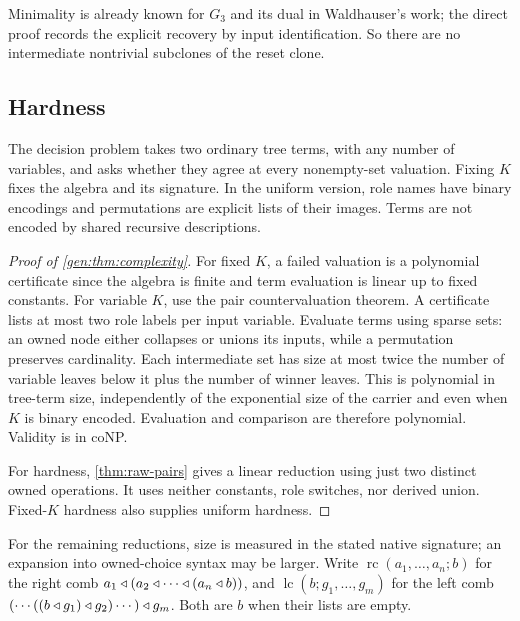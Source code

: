 Minimality is already known for $G_3$ and its dual in Waldhauser's work; the direct proof records the explicit recovery by input identification. So there are no intermediate nontrivial subclones of the reset clone.

\subsection{Hardness}\label{app:proofs-hard}

The decision problem takes two ordinary tree terms, with any number of variables, and asks whether they agree at every nonempty-set valuation. Fixing $K$ fixes the algebra and its signature. In the uniform version, role names have binary encodings and permutations are explicit lists of their images. Terms are not
encoded by shared recursive descriptions.

\begin{proof}[Proof of \cref{gen:thm:complexity}]
For fixed $K$, a failed valuation is a polynomial certificate since the
algebra is finite and term evaluation is linear up to fixed constants.
For variable $K$, use the pair countervaluation theorem. A certificate
lists at most two role labels per input variable. Evaluate terms using
sparse sets: an owned node either collapses or unions its inputs, while
a permutation preserves cardinality. Each intermediate set has size at
most twice the number of variable leaves below it plus the number of
winner leaves. This is polynomial in tree-term size, independently of
the exponential size of the carrier and even when $K$ is binary encoded.
Evaluation and comparison are therefore polynomial. Validity is in coNP.

For hardness, \cref{thm:raw-pairs} gives a linear reduction
using just two distinct owned operations. It uses neither constants,
role switches, nor derived union. Fixed-$K$ hardness also supplies
uniform hardness.
\end{proof}

For the remaining reductions, size is measured in the stated native signature; an expansion into owned-choice syntax may be larger. Write $\operatorname{rc}(a_1,\ldots,a_n;b)$ for the right comb
$a_1\mathbin{\triangleleft}(a_2\mathbin{\triangleleft}\cdots\mathbin{\triangleleft}(a_n\mathbin{\triangleleft} b))$, and $\operatorname{lc}(b;g_1,\ldots,g_m)$ for the left comb $(\cdots((b\mathbin{\triangleleft} g_1)\mathbin{\triangleleft} g_2)\cdots)\mathbin{\triangleleft} g_m$. Both are $b$ when their lists are empty.


